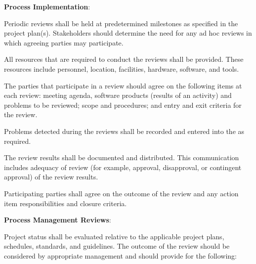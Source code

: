 			\begin{adjustwidth}{2em}{0pt} 

				\begin{compactenum}

					\item {\bf Process Implementation}:

					\begin{compactenum}

						\item Periodic reviews shall be held at predetermined milestones as specified in the project plan(s). Stakeholders should determine the need for any ad hoc reviews in which agreeing parties may participate.

						\item All resources that are required to conduct the reviews shall be provided. These resources include personnel, location, facilities, hardware, software, and tools.

						\item The parties that participate in a review should agree on the following items at each review: meeting agenda, software products (results of an activity) and problems to be reviewed; scope and procedures; and entry and exit criteria for the review.

						\item Problems detected during the reviews shall be recorded and entered into the  as required.

						\item The review results shall be documented and distributed. This communication includes adequacy of review (for example, approval, disapproval, or contingent approval) of the review results.

						\item Participating parties shall agree on the outcome of the review and any action item responsibilities and closure criteria.

					\end{compactenum}

					\item {\bf Process Management Reviews}:

					\begin{compactenum}

						\item Project status shall be evaluated relative to the applicable project plans, schedules, standards, and guidelines. The outcome of the review should be considered by appropriate management and should provide for the following:


\end{compactenum}
\end{compactenum}
\end{adjustwidth}
